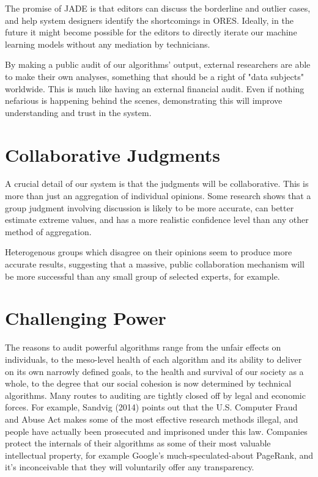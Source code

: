 \documentclass{sigchi-ext}
\begin{document}
The promise of JADE is that editors can discuss the borderline and outlier cases, and help system designers identify the shortcomings in ORES.  Ideally, in the future it might become possible for the editors to directly iterate our machine learning models without any mediation by technicians.

By making a public audit of our algorithms' output, external researchers are able to make their own analyses, something that should be a right of "data subjects" worldwide.  This is much like having an external financial audit.  Even if nothing nefarious is happening behind the scenes, demonstrating this will improve understanding and trust in the system.\cite{sandvig2014auditing}

\section{Collaborative Judgments}

A crucial detail of our system is that the judgments will be collaborative.  This is more than just an aggregation of individual opinions.  Some research shows that a group judgment involving discussion is likely to be more accurate, can better estimate extreme values, and has a more realistic confidence level than any other method of aggregation.\cite{sniezek1989accuracy}

Heterogenous groups which disagree on their opinions seem to produce more accurate results, suggesting that a massive, public collaboration mechanism will be more successful than any small group of selected experts, for example.\cite{schulz2006group}

\section{Challenging Power}

The reasons to audit powerful algorithms range from the unfair effects on individuals, to the meso-level health of each algorithm and its ability to deliver on its own narrowly defined goals, to the health and survival of our society as a whole, to the degree that our social cohesion is now determined by technical algorithms.  Many routes to auditing are tightly closed off by legal and economic forces.  For example, Sandvig (2014) points out that the U.S. Computer Fraud and Abuse Act makes some of the most effective research methods illegal, and people have actually been prosecuted and imprisoned under this law.  Companies protect the internals of their algorithms as some of their most valuable intellectual property, for example Google's much-speculated-about PageRank, and it's inconceivable that they will voluntarily offer any transparency.
\end{document}
